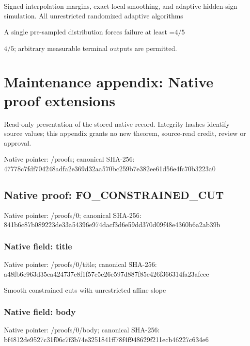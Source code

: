 \documentclass[10pt,a4paper]{article}
\newcommand{\AtlasMath}[1]{\par\begingroup\centering\setbox0=\hbox{$\displaystyle #1$}\ifdim\wd0>1.4\linewidth\typeout{ATLAS WIDE FORMULA: \the\wd0}\fi\ifdim\wd0>\linewidth\resizebox{\linewidth}{!}{\box0}\else\box0\fi\par\endgroup}
\newcommand{\AtlasInlineMath}[1]{\begingroup\setbox0=\hbox{$#1$}\ifdim\wd0>.4\linewidth\endgroup\AtlasMath{#1}\else\endgroup$#1$\fi}
\begin{document}
Signed interpolation margins, exact-local smoothing, and adaptive hidden-sign simulation. All unrestricted randomized adaptive algorithms



A single pre-sampled distribution forces failure at least \AtlasInlineMath{4/5}; arbitrary measurable terminal outputs are permitted.



\section{Maintenance appendix: Native proof extensions}


Read-only presentation of the stored native record. Integrity hashes identify source values; this appendix grants no new theorem, source-read credit, review or approval.



Native pointer: /proofs; canonical SHA-256: 47778c7fdf704248adfa2e36\allowbreak{}9d32aa570bc259b7e382ee61\allowbreak{}d56e4fc70b3223a0



\subsection{Native proof: FO\_CONSTRAINED\_CUT}


Native pointer: /proofs/0; canonical SHA-256: 841b6c87b089223de33a5439\allowbreak{}6e974dacf3d6e59dd370d09f\allowbreak{}48e4360b6a2ab39b



\subsubsection{Native field: title}


Native pointer: /proofs/0/title; canonical SHA-256: a48fb6c963d35ca424737e8f\allowbreak{}1f57c5e26e597d887f85e426\allowbreak{}f366314fa23afcee


Smooth constrained cuts with unrestricted affine slope


\subsubsection{Native field: body}


Native pointer: /proofs/0/body; canonical SHA-256: bf4812de9527c31f06c7f3b7\allowbreak{}4e3251841ff78f4f948629f2\allowbreak{}11ecb46227c634e6
\end{document}

